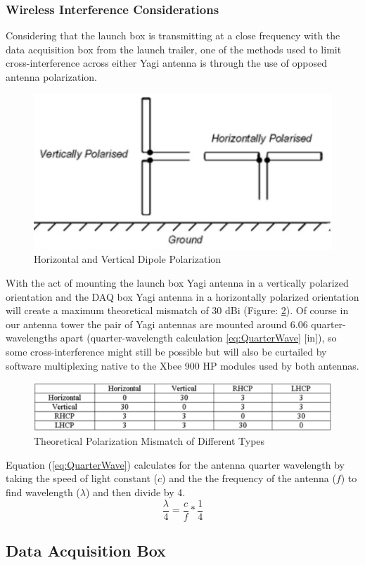 \documentclass[10pt,a4paper]{article}
\begin{document}
\subsubsection{Wireless Interference Considerations} \label{PolarizationMismatch}
 Considering that the launch box is transmitting at a close frequency with the data acquisition box from the launch trailer, one of the methods used to limit cross-interference across either Yagi antenna is through the use of opposed antenna polarization.
\begin{figure}[h!]
	\centering
	\includegraphics[width=.35\textwidth]{./figs/AntennaPolarization.jpg}
	\caption{Horizontal and Vertical Dipole Polarization}
	\label{fig:polarization}
\end{figure}
With the act of mounting the launch box Yagi antenna in a vertically polarized orientation and the DAQ box Yagi antenna in a horizontally polarized orientation will create a maximum theoretical mismatch of 30 dBi (Figure: \ref{fig:Mismatch}). Of course in our antenna tower the pair of Yagi antennas are mounted around 6.06 quarter-wavelengths apart (quarter-wavelength calculation \ref{eq:QuarterWave} [in]), so some cross-interference might still be possible but will also be curtailed by software multiplexing native to the Xbee 900 HP modules used by both antennas.
\begin{figure}[h!]
	\centering
	\includegraphics[width=.6\textwidth]{./figs/PolarizationTable.png}
	\caption{Theoretical Polarization Mismatch of Different Types}
	\label{fig:Mismatch}
\end{figure}
Equation (\ref{eq:QuarterWave}) calculates for the antenna quarter wavelength by taking the speed of light constant ($c$) and the the frequency of the antenna ($f$) to find wavelength ($\lambda$) and then divide by 4.
\begin{equation}
	\frac{\lambda}{4}= \frac{c}{f}*\frac{1}{4}
	\label{eq:QuarterWave}
\end{equation}


\subsection{Data Acquisition Box}
\end{document}
